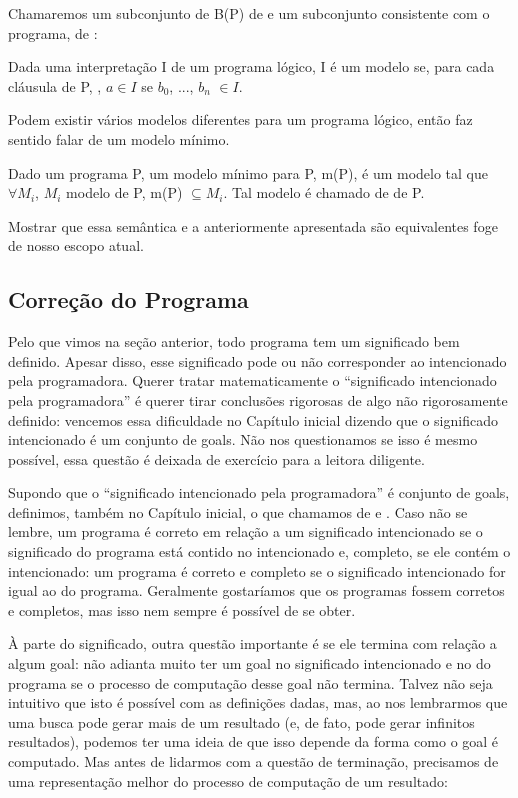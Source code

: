 \documentclass{article}
\begin{document}
  Chamaremos um subconjunto de B(P) de  e um subconjunto consistente com o programa, de :

\begin{definition} Dada uma interpretação I de um programa lógico, I é um modelo se, para cada cláusula de P, , $a \in I$ se $b_0$, ..., $b_n$ $\in I$.
\end{definition}

 Podem existir vários modelos diferentes para um programa lógico, então faz sentido falar de um modelo mínimo.

\begin{definition} Dado um programa P, um modelo mínimo para P, m(P), é um modelo tal que $\forall M_i$, $M_i$ modelo de P, m(P) $\subseteq M_i$. Tal modelo é chamado de  de P.
\end{definition}

Mostrar que essa semântica e a anteriormente apresentada são equivalentes foge de nosso escopo atual.

\subsection{Correção do Programa}

Pelo que vimos na seção anterior, todo programa tem um significado bem definido. Apesar disso, esse significado pode ou não corresponder ao intencionado pela programadora. Querer tratar matematicamente o ``significado intencionado pela programadora'' é querer tirar conclusões rigorosas de algo não rigorosamente definido: vencemos essa dificuldade no Capítulo inicial dizendo que o significado intencionado é um conjunto de goals. Não nos questionamos se
isso é mesmo possível, essa questão é deixada de exercício para a leitora diligente.

Supondo que o ``significado intencionado pela programadora'' é conjunto de goals, definimos, também no Capítulo inicial, o que chamamos de  e . Caso não se lembre, um programa é correto em relação a um significado intencionado se o significado do programa está contido no intencionado e, completo, se ele contém o intencionado: um programa é correto e completo se o significado intencionado for igual ao do programa.
Geralmente gostaríamos que os programas fossem corretos e completos, mas isso nem sempre é possível de se obter.

À parte do significado, outra questão importante é se ele termina com relação a algum goal: não adianta muito ter um goal no significado intencionado e no do programa se o processo de computação desse goal não termina. Talvez não seja intuitivo que isto é possível com as definições dadas, mas, ao nos lembrarmos que uma busca pode gerar mais de um resultado (e, de fato, pode gerar infinitos resultados), podemos ter uma ideia de que isso depende da forma como o goal é
computado. Mas antes de lidarmos com a questão de terminação, precisamos de uma representação melhor do processo de computação de um resultado:
\end{document}
